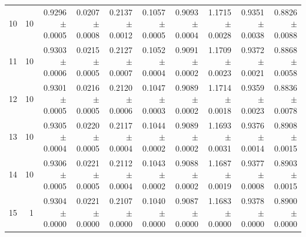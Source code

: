\begin{table}
\begin{tabular}{lrrrrrrrrr}
10 &       10 & 0.9296 $\pm$ 0.0005 & 0.0207 $\pm$ 0.0008 & 0.2137 $\pm$ 0.0012 & 0.1057 $\pm$ 0.0005 & 0.9093 $\pm$ 0.0004 & 1.1715 $\pm$ 0.0028 &   0.9351 $\pm$ 0.0038 & 0.8826 $\pm$ 0.0088 \\
11 &       10 & 0.9303 $\pm$ 0.0006 & 0.0215 $\pm$ 0.0005 & 0.2127 $\pm$ 0.0007 & 0.1052 $\pm$ 0.0004 & 0.9091 $\pm$ 0.0002 & 1.1709 $\pm$ 0.0023 &   0.9372 $\pm$ 0.0021 & 0.8868 $\pm$ 0.0058 \\
12 &       10 & 0.9301 $\pm$ 0.0005 & 0.0216 $\pm$ 0.0005 & 0.2120 $\pm$ 0.0006 & 0.1047 $\pm$ 0.0003 & 0.9089 $\pm$ 0.0002 & 1.1714 $\pm$ 0.0018 &   0.9359 $\pm$ 0.0023 & 0.8836 $\pm$ 0.0078 \\
13 &       10 & 0.9305 $\pm$ 0.0004 & 0.0220 $\pm$ 0.0005 & 0.2117 $\pm$ 0.0004 & 0.1044 $\pm$ 0.0002 & 0.9089 $\pm$ 0.0002 & 1.1693 $\pm$ 0.0031 &   0.9376 $\pm$ 0.0014 & 0.8908 $\pm$ 0.0015 \\
14 &       10 & 0.9306 $\pm$ 0.0005 & 0.0221 $\pm$ 0.0005 & 0.2112 $\pm$ 0.0004 & 0.1043 $\pm$ 0.0002 & 0.9088 $\pm$ 0.0002 & 1.1687 $\pm$ 0.0019 &   0.9377 $\pm$ 0.0008 & 0.8903 $\pm$ 0.0015 \\
15 &        1 & 0.9304 $\pm$ 0.0000 & 0.0221 $\pm$ 0.0000 & 0.2107 $\pm$ 0.0000 & 0.1040 $\pm$ 0.0000 & 0.9087 $\pm$ 0.0000 & 1.1683 $\pm$ 0.0000 &   0.9378 $\pm$ 0.0000 & 0.8900 $\pm$ 0.0000 \\
\bottomrule
\end{tabular}
\end{table}
